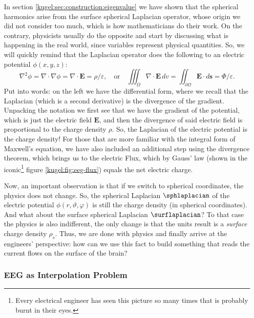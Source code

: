 In section \ref{kugel:sec:construction:eigenvalue} we have shown that the
spherical harmonics arise from the surface spherical Laplacian operator, whose
origin we did not consider too much, which is how mathematicians do their work.
On the contrary, physicists usually do the opposite and start by discussing what
is happening in the real world, since variables represent physical quantities.
So, we will quickly remind that the Laplacian operator does the following to an
electric potential $\phi(x, y, z)$:
\begin{equation*}
  \nabla^2 \phi
  = \nabla \cdot \nabla \phi
  = \nabla \cdot \mathbf{E}
  = \rho / \varepsilon,
  \quad \text{or} \quad
  \iiint_\Omega \nabla \cdot \mathbf{E} \, dv
  = \iint_{\partial \Omega} \mathbf{E} \cdot d\mathbf{s}
  = \Phi / \varepsilon.
\end{equation*}
Put into words: on the left we have the differential form, where we recall that
the Laplacian (which is a second derivative) is the divergence of the gradient.
Unpacking the notation we first see that we have the gradient of the potential,
which is just the electric field $\mathbf{E}$, and then the divergence of said
electric field is proportional to the charge density $\rho$. So, the Laplacian
of the electric potential is the charge density! For those that are more
familiar with the integral form of Maxwell's equation, we have also included an
additional step using the divergence theorem, which brings us to the electric
Flux, which by Gauss' law (shown in the iconic\footnote{Every electrical
engineer has seen this picture so many times that is probably burnt in their
eyes.} figure \ref{kugel:fig:eeg-flux}) equals the net electric charge.

Now, an important observation is that if we switch to spherical coordinates, the
physics does not change. So, the spherical Laplacian $\sphlaplacian$ of the
electric potential $\phi(r, \vartheta, \varphi)$ is still the charge density (in
spherical coordinates). And what about the surface spherical Laplacian
$\surflaplacian$? To that case the physics is also indifferent, the only change
is that the units result is a \emph{surface} charge density $\rho_s$. Thus, we
are done with physics and finally arrive at the engineers' perspective: how can
we use this fact to build something that reads the current flows on the surface
of the brain?

\subsubsection{EEG as Interpolation Problem}

